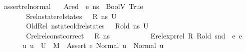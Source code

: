 \begin{isabellebody}
\ \ \isamarkupfalse%
\isanewline
{}\isamarkupfalse%
%
\endisatagproof
{\isafoldproof}%
%
\isadelimproof
\isanewline
%
\endisadelimproof
\isanewline
{}\isamarkupfalse%
\ assert{\isacharunderscore}{\kern0pt}rel{\isacharunderscore}{\kern0pt}normal{\isacharunderscore}{\kern0pt}{}{\isacharcolon}{\kern0pt}\isanewline
\ \ \ Ared{\isacharcolon}{\kern0pt}{\isachardoublequoteopen}{\isasymLambda}{\isacharcomma}{\kern0pt}{\isasymGamma}{\isacharcomma}{\kern0pt}{\isasymOmega}\ {\isasymturnstile}\ {\isasymlangle}e{}{\isacharcomma}{\kern0pt}\ ns{\isasymrangle}\ {\isasymDown}\ {\isacharparenleft}{\kern0pt}BoolV\ True{\isacharparenright}{\kern0pt}{\isachardoublequoteclose}\ \isanewline
\ \ \ \ \ \ \ \ \ \ Srel{\isacharcolon}{\kern0pt}{\isachardoublequoteopen}nstate{\isacharunderscore}{\kern0pt}rel{\isacharunderscore}{\kern0pt}states\ {\isasymLambda}\ {\isasymLambda}{\isacharprime}{\kern0pt}\ R\ ns\ U{\isachardoublequoteclose}\ \isanewline
\ \ \ \ \ \ \ \ \ \ OldRel{\isacharcolon}{\kern0pt}\ {\isachardoublequoteopen}nstate{\isacharunderscore}{\kern0pt}old{\isacharunderscore}{\kern0pt}rel{\isacharunderscore}{\kern0pt}states\ {\isasymLambda}\ {\isasymLambda}{\isacharprime}{\kern0pt}\ R{\isacharunderscore}{\kern0pt}old\ ns\ U{\isachardoublequoteclose}\ \isanewline
\ \ \ \ \ \ \ \ \ \ Crel{\isacharcolon}{\kern0pt}{\isachardoublequoteopen}rel{\isacharunderscore}{\kern0pt}const{\isacharunderscore}{\kern0pt}correct\ {\isasymLambda}\ {\isasymOmega}\ R\ ns{\isachardoublequoteclose}\ \isanewline
\ \ \ \ \ \ \ \ \ \ Erel{\isacharcolon}{\kern0pt}{\isachardoublequoteopen}expr{\isacharunderscore}{\kern0pt}rel\ R\ R{\isacharunderscore}{\kern0pt}old\ {\isacharparenleft}{\kern0pt}snd\ {\isasymLambda}{\isacharparenright}{\kern0pt}\ e{}\ e{}{\isachardoublequoteclose}\isanewline
\ \ \ \ \ \ \ \ \ {\isachardoublequoteopen}{\isasymAnd}u{\isachardot}{\kern0pt}\ u\ {\isasymin}\ U\ {\isasymLongrightarrow}\ M{\isacharcomma}{\kern0pt}{\isasymLambda}{\isacharprime}{\kern0pt}{\isacharcomma}{\kern0pt}{\isasymGamma}{\isacharcomma}{\kern0pt}{\isasymOmega}\ {\isasymturnstile}\ {\isasymlangle}Assert\ e{}{\isacharcomma}{\kern0pt}\ Normal\ u{\isasymrangle}\ {\isasymrightarrow}\ Normal\ u{\isachardoublequoteclose}\isanewline
%
\isadelimproof
%
\endisadelimproof
%
\isatagproof
{}\isamarkupfalse%
\ {\isacharminus}{\kern0pt}\isanewline
\ \ \isamarkupfalse%

\end{isabellebody}
